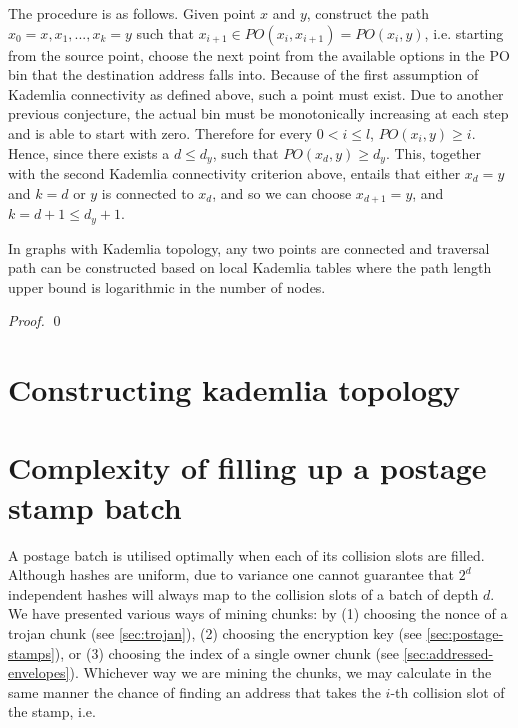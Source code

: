 The procedure is as follows. Given point $x$ and $y$, construct the path $x_0=x , x_1, ..., x_k=y$ such that $x_{i+1}\in \mathit{PO}(x_i, x_{i+1})=\mathit{PO}(x_i, y)$, i.e. starting from the source point, choose the next point from the available options in the PO bin that the destination address falls into. Because of the first assumption of Kademlia connectivity as defined above, such a point must exist. Due to another previous conjecture, the actual bin must be monotonically increasing at each step and is able to start with zero. Therefore for every $0<i\leq l$, $\mathit{PO}(x_{i}, y)\geq i$. Hence, since there exists a $d\leq d_y$, such that 
$\mathit{PO}(x_{d}, y)\geq d_y$. This, together with the second Kademlia connectivity criterion above, entails that either $x_d=y$ and $k=d$ or $y$ is connected to $x_d$, and so we can choose $x_{d+1}=y$, and $k=d+1\leq d_y+1$.

\begin{theorem}{In graphs with Kademlia topology, any two points are connected and traversal path can be constructed based on local Kademlia tables where the path length upper bound is logarithmic in the number of nodes.}

\begin{proof}



\qed
\end{proof}
\end{theorem}

\section{Constructing kademlia topology \statusred}

\section{Complexity of filling up a postage stamp batch \statusgreen}\label{sec:complexity-filling}

A postage batch is utilised optimally when each of its collision slots are filled. Although hashes are uniform, due to variance one cannot guarantee that $2^d$ independent hashes will always map to the collision slots of a batch of depth $d$.
We have presented various ways of mining chunks: by (1) choosing the nonce of a trojan chunk (see \ref{sec:trojan}), (2) choosing the encryption key (see \ref{sec:postage-stamps}), or (3) choosing the index of a single owner chunk (see \ref{sec:addressed-envelopes}). Whichever way we are mining the chunks, we may calculate in the same manner the chance of finding an address that takes the $i$-th collision slot of the stamp, i.e.


